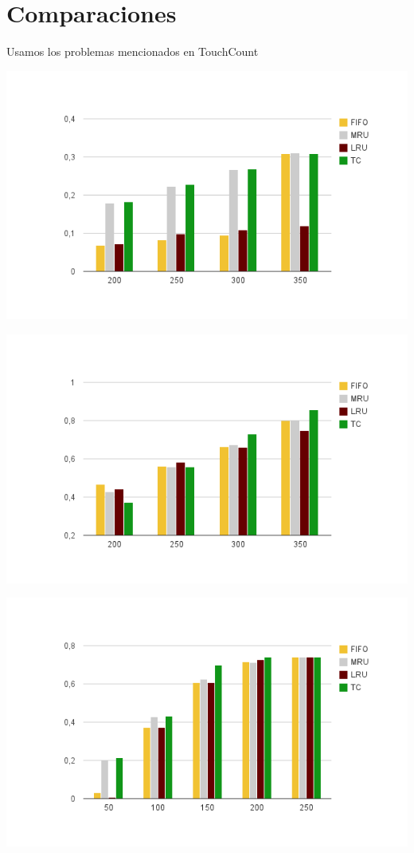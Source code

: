 \section{Comparaciones}
Usamos los problemas mencionados en TouchCount

\includegraphics[scale=.80]{grafico1-1}

\includegraphics[scale=.80]{grafico1-2}

\includegraphics[scale=.80]{grafico2-1}

